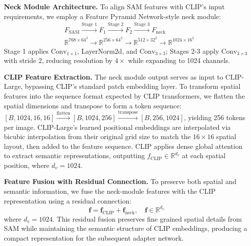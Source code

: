 \documentclass{article}
\theoremstyle{plain}
\theoremstyle{definition}
\theoremstyle{remark}
\begin{document}
\textbf{Neck Module Architecture.} To align SAM features with CLIP's input requirements, 
we employ a Feature Pyramid Network-style neck module:
\begin{align*}
&F_{\text{SAM}} \xrightarrow{\text{Stage 1}} F_1 \xrightarrow{\text{Stage 2}} F_2 \xrightarrow{\text{Stage 3}} F_{\text{neck}} \\
&\mathbb{R}^{768 \times 64^2} \rightarrow \mathbb{R}^{256 \times 64^2} \rightarrow \mathbb{R}^{512 \times 32^2} \rightarrow \mathbb{R}^{1024 \times 16^2}
\end{align*}
Stage 1 applies $\text{Conv}_{1\times1}$, LayerNorm2d, and $\text{Conv}_{3\times3}$; 
Stages 2-3 apply $\text{Conv}_{3\times3}$ with stride 2, reducing resolution by $4\times$ 
while expanding to 1024 channels.


\textbf{CLIP Feature Extraction.} The neck module output serves as input to CLIP-Large, 
bypassing CLIP's standard patch embedding layer. To transform spatial features into the 
sequence format expected by CLIP transformers, we flatten the spatial dimensions and transpose 
to form a token sequence: $[B, 1024, 16, 16] \xrightarrow{\text{flatten}} [B, 1024, 256] \xrightarrow{\text{transpose}} [B, 256, 1024]$, 
yielding 256 tokens per image. CLIP-Large's learned positional embeddings are interpolated 
via bicubic interpolation from their original grid size to match the $16 \times 16$ spatial 
layout, then added to the feature sequence.  CLIP applies dense global attention to 
extract semantic representations, outputting $f_{\text{CLIP}} \in \mathbb{R}^{d_v}$ at each 
spatial position, where $d_v = 1024$.


\textbf{Feature Fusion with Residual Connection.} 
To preserve both spatial and semantic information, we fuse the neck-module features with the CLIP representation using a residual connection:
\[
\mathbf{f} = \mathbf{f}_{\text{CLIP}} + \mathbf{f}_{\text{neck}}, \quad \mathbf{f} \in \mathbb{R}^{d_v}
\]
where $d_v = 1024$. This residual fusion preserves fine grained spatial details from SAM while maintaining the semantic structure of CLIP embeddings, producing a compact representation for the subsequent adapter network.
\end{document}

